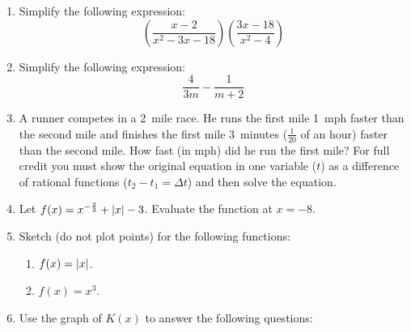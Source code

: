 \documentclass[letterpaper,12pt,fleqn]{article}
\begin{document}
\begin{enumerate}
\item Simplify the following expression:
  \[\left(\frac{x-2}{x^2-3x-18}\right)\left(\frac{3x-18}{x^2-4}\right)\]

  \newpage

\item Simplify the following expression:
  \[\frac{4}{3m}-\frac{1}{m+2}\]

  \vspace{3in}

\item A runner competes in a \SI{2}{mile} race. He runs the first mile
  \SI{1}{mph} faster than the second mile and finishes the first mile
  \SI{3}{minutes} ($\frac{1}{20}$ of an hour) faster than the second mile.
  How fast (in mph) did he run the first mile? For full credit you must show
  the original equation in one variable ($t$) as a difference of rational
  functions ($t_2-t_1=\Delta{t}$) and then solve the equation.

  \newpage

\item Let $f(x)=x^{-\frac{2}{3}}+\lvert x\rvert-3$. Evaluate the function at
  $x=-8$.

  \vspace{1.5in}

\item Sketch (do not plot points) for the following functions:

  \vspace{0.5in}
  
  \begin{enumerate}
  \item $f(x)=\lvert x\rvert$.


    \vspace{0.5in}

  \item $f(x)=x^3$.

  \end{enumerate}

  \newpage

\item Use the graph of $K(x)$ to answer the following questions:


\end{enumerate}
\end{document}
